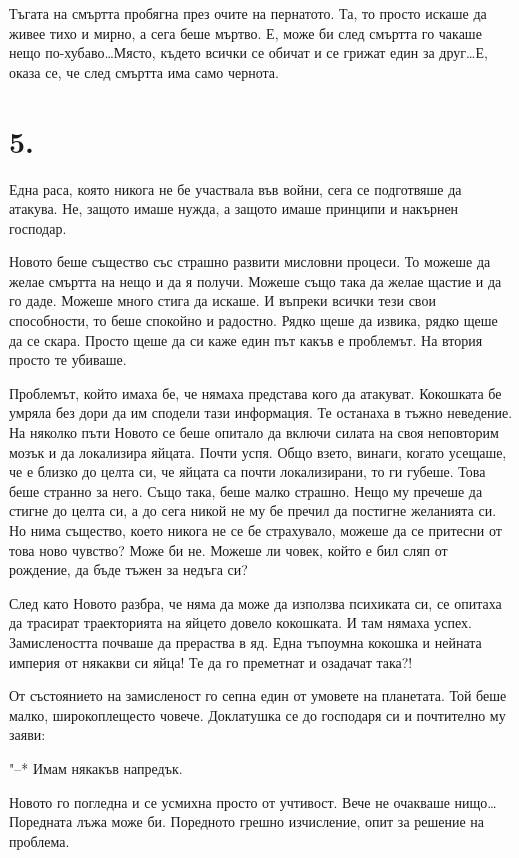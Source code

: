 \documentclass[ebook,openany,12pt]{memoir}
\begin{document}
Тъгата на смъртта пробягна през очите на пернатото. Та, то просто искаше да живее тихо и мирно, а сега беше мъртво. Е, може би след смъртта го чакаше нещо по-хубаво\ldots Място, където всички се обичат и се грижат един за друг\ldots Е, оказа се, че след смъртта има само чернота.

\section*{5.}

Една раса, която никога не бе участвала във войни, сега се подготвяше да атакува. Не, защото имаше нужда, а защото имаше принципи и накърнен господар.

Новото беше същество със страшно развити мисловни процеси. То можеше да желае смъртта на нещо и да я получи. Можеше също така да желае щастие и да го даде. Можеше много стига да искаше. И въпреки всички тези свои способности, то беше спокойно и радостно. Рядко щеше да извика, рядко щеше да се скара. Просто щеше да си каже един път какъв е проблемът. На втория просто те убиваше.

Проблемът, който имаха бе, че нямаха представа кого да атакуват. Кокошката бе умряла без дори да им сподели тази информация. Те останаха в тъжно неведение. На няколко пъти Новото се беше опитало да включи силата на своя неповторим мозък и да локализира яйцата. Почти успя. Общо взето, винаги, когато усещаше, че е близко до целта си, че яйцата са почти локализирани, то ги губеше. Това беше странно за него. Също така, беше малко страшно. Нещо му пречеше да стигне до целта си, а до сега никой не му бе пречил да постигне желанията си. Но нима същество, което никога не се бе страхувало, можеше да се притесни от това ново чувство? Може би не. Можеше ли човек, който е бил сляп от рождение, да бъде тъжен за недъга си?

След като Новото разбра, че няма да може да използва психиката си, се опитаха да трасират траекторията на яйцето довело кокошката. И там нямаха успех. Замислеността почваше да прераства в яд. Една тъпоумна кокошка и нейната империя от някакви си яйца! Те да го преметнат и озадачат така?!

От състоянието на замисленост го сепна един от умовете на планетата. Той беше малко, широкоплещесто човече. Доклатушка се до господаря си и почтително му заяви:

"--* Имам някакъв напредък.

Новото го погледна и се усмихна просто от учтивост. Вече не очакваше нищо\ldots Поредната лъжа може би. Поредното грешно изчисление, опит за решение на проблема.
\end{document}
